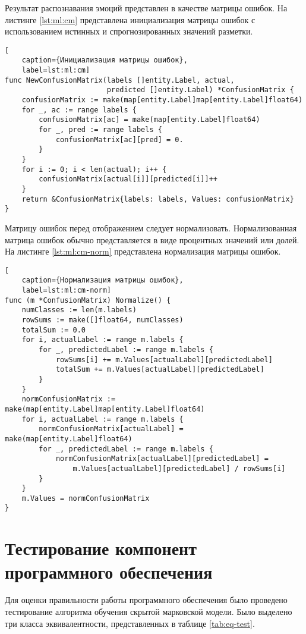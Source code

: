 Результат распознавания эмоций представлен в качестве матрицы ошибок. На листинге \ref{lst:ml:cm} представлена инициализация матрицы ошибок с использованием истинных и спрогнозированных значений разметки.
\begin{lstlisting}[
	caption={Инициализация матрицы ошибок},
	label=lst:ml:cm]
func NewConfusionMatrix(labels []entity.Label, actual,
						predicted []entity.Label) *ConfusionMatrix {
	confusionMatrix := make(map[entity.Label]map[entity.Label]float64)
	for _, ac := range labels {
		confusionMatrix[ac] = make(map[entity.Label]float64)
		for _, pred := range labels {
			confusionMatrix[ac][pred] = 0.
		}
	}
	for i := 0; i < len(actual); i++ {
		confusionMatrix[actual[i]][predicted[i]]++
	}
	return &ConfusionMatrix{labels: labels, Values: confusionMatrix}
}
\end{lstlisting}
Матрицу ошибок перед отображением следует нормализовать. Нормализованная матрица ошибок обычно представляется в виде процентных значений или долей. На листинге \ref{lst:ml:cm-norm} представлена нормализация матрицы ошибок.
\begin{lstlisting}[
	caption={Нормализация матрицы ошибок},
	label=lst:ml:cm-norm]
func (m *ConfusionMatrix) Normalize() {
	numClasses := len(m.labels)
	rowSums := make([]float64, numClasses)
	totalSum := 0.0
	for i, actualLabel := range m.labels {
		for _, predictedLabel := range m.labels {
			rowSums[i] += m.Values[actualLabel][predictedLabel]
			totalSum += m.Values[actualLabel][predictedLabel]
		}
	}
	normConfusionMatrix := make(map[entity.Label]map[entity.Label]float64)
	for i, actualLabel := range m.labels {
		normConfusionMatrix[actualLabel] = make(map[entity.Label]float64)
		for _, predictedLabel := range m.labels {
			normConfusionMatrix[actualLabel][predictedLabel] = 
				m.Values[actualLabel][predictedLabel] / rowSums[i]
		}
	}
	m.Values = normConfusionMatrix
}
\end{lstlisting}


\section{Тестирование компонент программного обеспечения}
Для оценки правильности работы программного обеспечения было проведено тестирование алгоритма обучения скрытой марковской модели. Было выделено три класса эквивалентности, представленных в таблице \ref{tab:eq-test}.

